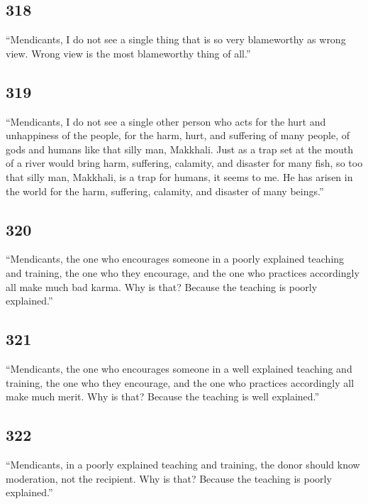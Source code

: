 \documentclass[12pt,openany]{book}%
\begin{document}
\subsection*{318 }

“Mendicants, I do not see a single thing that is so very blameworthy as wrong view. Wrong view is the most blameworthy thing of all.” 

\subsection*{319 }

“Mendicants, I do not see a single other person who acts for the hurt and unhappiness of the people, for the harm, hurt, and suffering of many people, of gods and humans like that silly man, Makkhali. Just as a trap set at the mouth of a river would bring harm, suffering, calamity, and disaster for many fish, so too that silly man, Makkhali, is a trap for humans, it seems to me. He has arisen in the world for the harm, suffering, calamity, and disaster of many beings.” 

\subsection*{320 }

“Mendicants, the one who encourages someone in a poorly explained teaching and training, the one who they encourage, and the one who practices accordingly all make much bad karma. Why is that? Because the teaching is poorly explained.” 

\subsection*{321 }

“Mendicants, the one who encourages someone in a well explained teaching and training, the one who they encourage, and the one who practices accordingly all make much merit. Why is that? Because the teaching is well explained.” 

\subsection*{322 }

“Mendicants, in a poorly explained teaching and training, the donor should know moderation, not the recipient. Why is that? Because the teaching is poorly explained.” 
\end{document}
